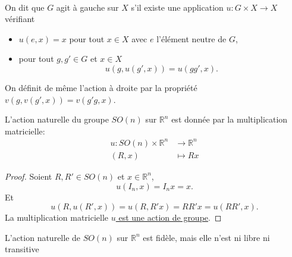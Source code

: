 \documentclass[12pt]{report}
\begin{document}
\begin{definition}\leavevmode\\
On dit que $G$ agit à gauche sur $X$ s'il existe une application $u\colon G\times X\longrightarrow X$ vérifiant
\begin{itemize}
  \item $u(e,x)=x$ pour tout $x\in X$ avec $e$ l'élément neutre de $G$,
  \item pour tout $g,g'\in G$ et $x\in X$
  \[
  u(g,u(g',x))=u(gg',x).
  \]
\end{itemize}
\end{definition}

\begin{remark}
On définit de même l'action à droite par la propriété $v(g,v(g',x))=v(g'g,x)$.
\end{remark}

\begin{proposition}
L'action naturelle du groupe $SO(n)$ sur $\mathbb{R}^n$ est donnée par la multiplication matricielle:
\[
\begin{aligned}
u\colon SO(n)\times \mathbb{R}^n&\longrightarrow \mathbb{R}^n\\
(R,x)&\longmapsto Rx
\end{aligned}
\]
\end{proposition}

\begin{proof}
Soient $R,R'\in SO(n)$ et $x\in \mathbb{R}^n$,
\[
u(I_n,x)=I_{n}x=x.
\]
Et
\[
u(R,u(R',x))=u(R,R'x)=RR'x=u(RR',x).
\]
La multiplication matricielle \underline{$u$ est une action de groupe}.
\end{proof}

\begin{proposition}
L'action naturelle de $SO(n)$ sur $\mathbb R^n$ est fidèle, mais elle n'est ni libre ni transitive
\end{proposition}
\end{document}
